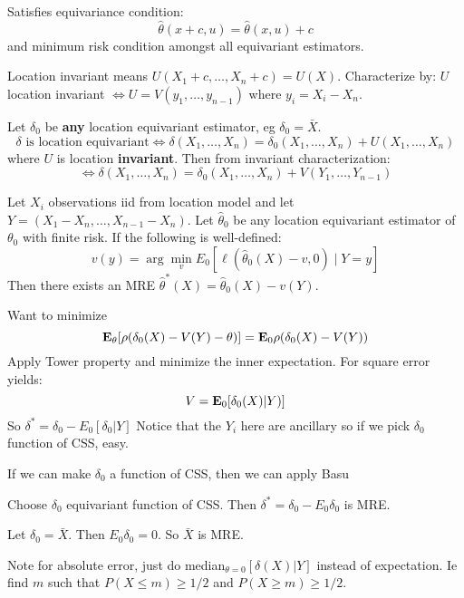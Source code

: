 \documentclass{article}
\begin{document}
\begin{definition}[MRE]
Satisfies equivariance condition: $$\hat \theta(x+c, u) = \hat \theta (x,u) + c$$
and minimum risk condition amongst all equivariant estimators. 
\end{definition}
\begin{definition}
Location invariant means $U(X_1 + c,\ldots,X_n + c) = U(X)$. Characterize by:
$U$ location invariant $\iff U = V(y_1, \ldots, y_{n-1})$ where $y_i = X_i - X_n$. 
\end{definition}
\begin{fact}
Let $\delta_0$ be \textbf{any} location equivariant estimator, eg $\delta_0 = \bar X$. 
$$\delta \text { is location equivariant} \iff \delta(X_1,\ldots,X_n) = \delta_0(X_1,\ldots,X_n) + U(X_1,\ldots, X_n) $$ 
where $U$ is location \textbf{invariant}. Then from invariant characterization:
$$\iff \delta(X_1,\ldots,X_n) = \delta_0(X_1,\ldots,X_n) + V(Y_1,\ldots, Y_{n-1})$$
\end{fact}

\begin{recipe}
Let $X_i$ observations iid from location model and let $Y = (X_1 - X_n, \ldots, X_{n-1} - X_n)$. Let $\hat \theta_0$ be any location equivariant estimator of $\theta_0$ with finite risk. If the following is well-defined:
$$v(y) = \arg \min _v E_0 [\ell(\hat \theta_0 (X) - v, 0) \mid Y = y]$$
Then there exists an MRE $\hat \theta^*(X) = \hat \theta_0(X) - v(Y)$.	
\end{recipe}

Want to minimize 
	$$\mathbf{E}_\theta [ \rho (\delta_0(X)- V(Y) - \theta)] = \mathbf{E}_0 \rho (\delta_0(X) - V(Y))$$
	Apply Tower property and minimize the inner expectation. For square error yields:
	$$V = \mathbf{E}_0 [\delta_0 (X) |Y)]$$
	So $\delta^* = \delta_0 - E_0 [\delta_0 |Y]$
Notice that the $Y_i$ here are ancillary so if we pick $\delta_0$ function of CSS, easy. 


If we can make $\delta_0$ a function of CSS, then we can apply Basu
\begin{recipe}
	Choose $\delta_0$ equivariant function of CSS. Then $\delta^* = \delta_0 - E_0 \delta_0$ is MRE. 
	\begin{example}
	Let $\delta_0 = \bar X$. Then $E_0 \delta_0 = 0$. So $\bar X$ is MRE.
\end{example}
\end{recipe}
Note for absolute error, just do median$_{\theta=0}[\delta(X)|Y]$ instead of expectation. Ie find $m$ such that $P(X\leq m) \geq 1/2$ and $P(X\geq m) \geq 1/2$. 
\end{document}

